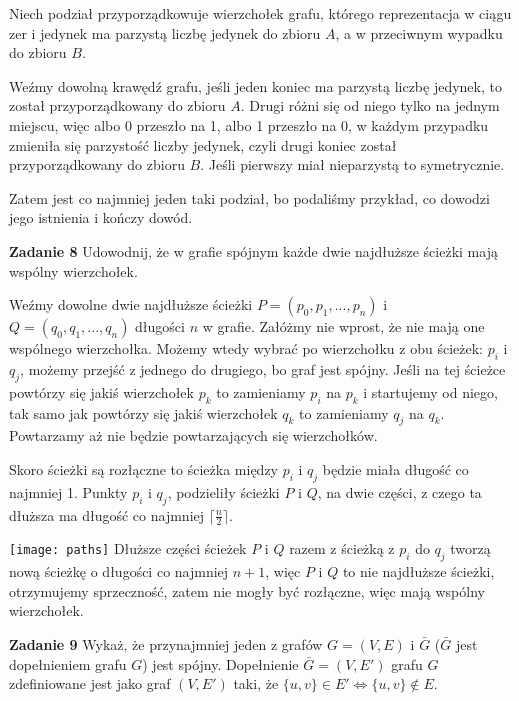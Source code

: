 \documentclass[12pt,a4paper]{article}
\begin{document}
Niech podział przyporządkowuje wierzchołek grafu, którego reprezentacja w ciągu zer i jedynek ma parzystą liczbę jedynek do zbioru \(A\), a w przeciwnym wypadku do zbioru \(B\).

Weźmy dowolną krawędź grafu, jeśli jeden koniec ma parzystą liczbę jedynek, to został przyporządkowany do zbioru \(A\). Drugi różni się od niego tylko na jednym miejscu, więc albo 0 przeszło na 1, albo 1 przeszło na 0, w każdym przypadku zmieniła się parzystość liczby jedynek, czyli drugi koniec został przyporządkowany do zbioru \(B\). Jeśli pierwszy miał nieparzystą to symetrycznie.

Zatem jest co najmniej jeden taki podział, bo podaliśmy przykład, co dowodzi jego istnienia i kończy dowód.

\vskip 0.5cm
\noindent
\textbf{Zadanie 8} Udowodnij, że w grafie spójnym każde dwie najdłuższe ścieżki mają wspólny wierzchołek.
\vskip 0.5cm

Weźmy dowolne dwie najdłuższe ścieżki \( P = (p_0, p_1, ..., p_n) \) i \(Q = (q_0, q_1,...,q_n) \) długości \(n\) w grafie. Załóżmy nie wprost, że nie mają one wspólnego wierzchołka. Możemy wtedy wybrać po wierzchołku z obu ścieżek: \( p_i \) i \( q_j \), możemy przejść z jednego do drugiego, bo graf jest spójny. Jeśli na tej ścieżce powtórzy się jakiś wierzchołek \(p_k\) to zamieniamy \(p_i\) na \(p_k\) i startujemy od niego, tak samo jak powtórzy się jakiś wierzchołek \(q_k\) to zamieniamy \(q_j\) na \(q_k\). Powtarzamy aż nie będzie powtarzających się wierzchołków.

Skoro ścieżki są rozłączne to ścieżka między \( p_i \) i \( q_j \) będzie miała długość co najmniej 1. Punkty \( p_i \) i \( q_j \), podzieliły ścieżki \(P\) i \(Q\), na dwie części, z czego ta dłuższa ma długość co najmniej \( \lceil \frac{n}{2} \rceil \).

\texttt{[image: paths]}
Dłuższe części ścieżek \(P\) i \(Q\) razem z ścieżką z \( p_i \) do \( q_j \) tworzą nową ścieżkę o długości co najmniej \( n + 1 \), więc \(P\) i \(Q\) to nie najdłuższe ścieżki, otrzymujemy sprzeczność, zatem nie mogły być rozłączne, więc mają wspólny wierzchołek.

\newpage
\vskip 0.5cm
\noindent
\textbf{Zadanie 9} Wykaż, że przynajmniej jeden z grafów \( G = (V,E) \) i \( \bar{G} \) (\(\bar{G}\) jest dopełnieniem grafu \(G\)) jest spójny. Dopełnienie \(\bar{G} = (V,E') \) grafu \( G \) zdefiniowane jest jako graf \( (V, E') \) taki, że \( \{ u,v \} \in E' \Leftrightarrow \{u,v\} \notin E \).
\vskip 0.5cm
\end{document}
